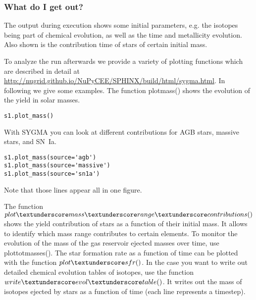 \subsubsection{What do I get out?}


The output during execution shows some initial parameters,
e.g. the isotopes being part of chemical evolution,
as well as the time and metallicity evolution.
Also shown is the contribution time of stars of 
certain initial mass.




To analyze the run afterwards we provide a variety of plotting  functions
which are described in detail at \url{http://nugrid.github.io/NuPyCEE/SPHINX/build/html/sygma.html}.
In following we give some examples. The function plot\textunderscore mass() shows the evolution
of the yield in solar masses.


\begin{verbatim}
s1.plot_mass()
\end{verbatim}

With SYGMA you can look at different contributions
for AGB stars, massive stars, and SN~Ia.

\begin{verbatim}
s1.plot_mass(source='agb')
s1.plot_mass(source='massive')
s1.plot_mass(source='sn1a')

\end{verbatim}

Note that those lines appear all in one figure.

The function $plot\textunderscore mass\textunderscore range\textunderscore contributions()$
shows the yield contribution of stars as a function of their initial mass.
It allows to identify which mass range contributes to certain elements.
To monitor the evolution of the mass of the gas reservoir ejected
masses over time, use plot\textunderscore totmasses().
The star formation rate as a function of time can be plotted with the function $plot\textunderscore sfr()$.
In the case you want to write out detailed chemical evolution tables
of isotopes, use the function $write\textunderscore evol\textunderscore table()$.
It writes out the mass of isotopes ejected by stars as a function of time
(each line represents a timestep).

